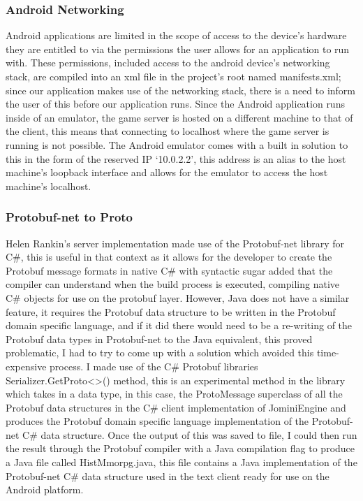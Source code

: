 \documentclass{article}
\begin{document}
\subsubsection{Android Networking}

Android applications are limited in the scope of access to the device’s hardware they are entitled to via the permissions the user allows for an application to run with. These permissions, included access to the android device’s networking stack, are compiled into an xml file in the project’s root named manifests.xml; since our application makes use of the networking stack, there is a need to inform the user of this before our application runs. Since the Android application runs inside of an emulator, the game server is hosted on a different machine to that of the client, this means that connecting to localhost where the game server is running is not possible. The Android emulator comes with a built in solution to this in the form of the reserved IP ‘10.0.2.2’, this address is an alias to the host machine’s loopback interface and allows for the emulator to access the host machine’s localhost.

\subsubsection{Protobuf-net to Proto}

Helen Rankin's server implementation made use of the Protobuf-net library for C\#, this is useful in that context as it allows for the developer to create the Protobuf message formats in native C\# with syntactic sugar added that the compiler can understand when the build process is executed, compiling native C\# objects for use on the protobuf layer. However, Java does not have a similar feature, it requires the Protobuf data structure to be written in the Protobuf domain specific language, and if it did there would need to be a re-writing of the Protobuf data types in Protobuf-net to the Java equivalent, this proved problematic, I had to try to come up with a solution which avoided this time-expensive process. I made use of the C\# Protobuf libraries Serializer.GetProto<>() method, this is an experimental method in the library which takes in a data type, in this case, the ProtoMessage superclass of all the Protobuf data structures in the C\# client implementation of JominiEngine and produces the Protobuf domain specific language implementation of the Protobuf-net C\# data structure. Once the output of this was saved to file, I could then run the result through the Protobuf compiler with a Java compilation flag to produce a Java file called HistMmorpg.java, this file contains a Java implementation of the Protobuf-net C\# data structure used in the text client ready for use on the Android platform.
\end{document}
